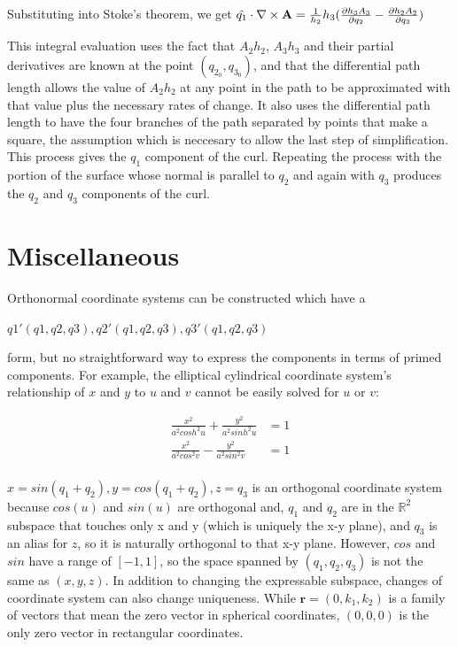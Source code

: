 \documentclass{article}
\begin{document}
Substituting into Stoke's theorem, we get $\hat{q_1} \cdot \nabla \times \textbf{A} = \frac{1}{h_2}{h_3} (\frac{\partial{h_3 A_3}}{\partial{q_2}} - \frac{\partial{h_2 A_2}}{\partial{q_3}}) $

This integral evaluation uses the fact that $A_2 h_2$, $A_3 h_3$ and their partial derivatives are known at the point $(q_{2_0}, q_{3_0})$, and that the differential path length allows the value of $A_2 h_2$ at any point in the path to be approximated with that value plus the necessary rates of change. It also uses the differential path length to have the four branches of the path separated by points that make a square, the assumption which is neccesary to allow the last step of simplification. This process gives the $q_1$ component of the curl. Repeating the process with the portion of the surface whose normal is parallel to $q_2$ and again with $q_3$ produces the $q_2$ and $q_3$ components of the curl.

\section*{Miscellaneous}
\label{sec:misc}

Orthonormal coordinate systems can be constructed which have a

$q1'(q1,q2,q3), q2'(q1,q2,q3), q3'(q1,q2,q3) $

form, but no straightforward way to express the components in terms of primed components. For example, the elliptical cylindrical coordinate system's relationship of $x$ and $y$ to $u$ and $v$ cannot be easily solved for $u$ or $v$:

\begin{align*}
\frac{x^2}{a^2 cosh^2 u} + \frac{y^2}{a^2 sinh^2 u} &= 1 \\
\frac{x^2}{a^2 cos^2 v} - \frac{y^2}{a^2 sin^2 v} &= 1 \\
\end{align*}

$x = sin(q_1 + q_2), y = cos(q_1 + q_2), z = q_3$ is an orthogonal coordinate system because $cos(u)$ and $sin(u)$ are orthogonal and, $q_1$ and $q_2$ are in the $\mathbb{R}^2$ subspace that touches only x and y (which is uniquely the x-y plane), and $q_3$ is an alias for $z$, so it is naturally orthogonal to that x-y plane. However, $cos$ and $sin$ have a range of $[-1,1]$, so the space spanned by $(q_1,q_2,q_3)$ is not the same as $(x,y,z)$. In addition to changing the expressable subspace, changes of coordinate system can also change uniqueness. While $\textbf{r} = (0, k_1, k_2)$ is a family of vectors that mean the zero vector in spherical coordinates, $(0,0,0)$ is the only zero vector in rectangular coordinates.

\printbibliography
\end{document}
